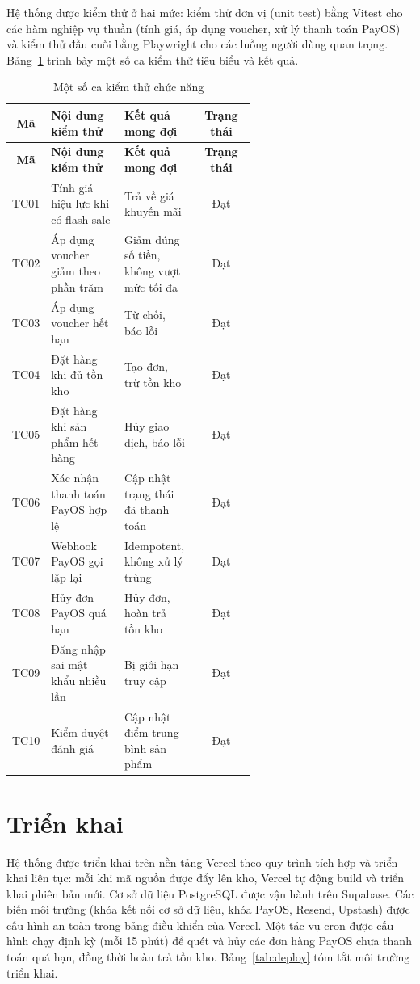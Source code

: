 Hệ thống được kiểm thử ở hai mức: kiểm thử đơn vị (unit test) bằng Vitest cho các hàm nghiệp vụ
thuần (tính giá, áp dụng voucher, xử lý thanh toán PayOS) và kiểm thử đầu cuối bằng Playwright
cho các luồng người dùng quan trọng. Bảng~\ref{tab:testcases} trình bày một số ca kiểm thử tiêu
biểu và kết quả.

\begin{longtable}{|c|>{\raggedright\arraybackslash}p{0.30\linewidth}|>{\raggedright\arraybackslash}p{0.30\linewidth}|c|}
\caption{Một số ca kiểm thử chức năng}\label{tab:testcases}\\
\hline
\rowcolor{gray!12}\textbf{Mã} & \textbf{Nội dung kiểm thử} & \textbf{Kết quả mong đợi} & \textbf{Trạng thái} \\ \hline
\endfirsthead
\hline
\rowcolor{gray!12}\textbf{Mã} & \textbf{Nội dung kiểm thử} & \textbf{Kết quả mong đợi} & \textbf{Trạng thái} \\ \hline
\endhead
TC01 & Tính giá hiệu lực khi có flash sale & Trả về giá khuyến mãi & Đạt \\ \hline
TC02 & Áp dụng voucher giảm theo phần trăm & Giảm đúng số tiền, không vượt mức tối đa & Đạt \\ \hline
TC03 & Áp dụng voucher hết hạn & Từ chối, báo lỗi & Đạt \\ \hline
TC04 & Đặt hàng khi đủ tồn kho & Tạo đơn, trừ tồn kho & Đạt \\ \hline
TC05 & Đặt hàng khi sản phẩm hết hàng & Hủy giao dịch, báo lỗi & Đạt \\ \hline
TC06 & Xác nhận thanh toán PayOS hợp lệ & Cập nhật trạng thái đã thanh toán & Đạt \\ \hline
TC07 & Webhook PayOS gọi lặp lại & Idempotent, không xử lý trùng & Đạt \\ \hline
TC08 & Hủy đơn PayOS quá hạn & Hủy đơn, hoàn trả tồn kho & Đạt \\ \hline
TC09 & Đăng nhập sai mật khẩu nhiều lần & Bị giới hạn truy cập & Đạt \\ \hline
TC10 & Kiểm duyệt đánh giá & Cập nhật điểm trung bình sản phẩm & Đạt \\ \hline
\end{longtable}

\section{Triển khai}

Hệ thống được triển khai trên nền tảng Vercel theo quy trình tích hợp và triển khai liên tục: mỗi
khi mã nguồn được đẩy lên kho, Vercel tự động build và triển khai phiên bản mới. Cơ sở dữ liệu
PostgreSQL được vận hành trên Supabase. Các biến môi trường (khóa kết nối cơ sở dữ liệu, khóa
PayOS, Resend, Upstash) được cấu hình an toàn trong bảng điều khiển của Vercel. Một tác vụ cron
được cấu hình chạy định kỳ (mỗi 15 phút) để quét và hủy các đơn hàng PayOS chưa thanh toán
quá hạn, đồng thời hoàn trả tồn kho. Bảng~\ref{tab:deploy} tóm tắt môi trường triển khai.

